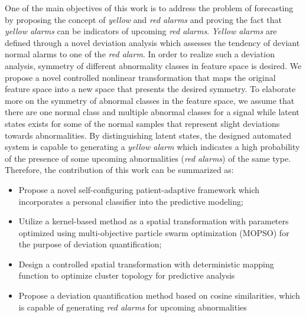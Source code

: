 
One of the main objectives of this work is to address the problem of forecasting by proposing the concept of \textit{yellow} and \textit{red alarms} and proving the fact that \textit{yellow alarms} can be indicators of upcoming \textit{red alarms}. \textit{Yellow alarms} are defined through a novel deviation analysis which assesses  the tendency of deviant normal alarms to one of the \textit{red alarm}. In order to realize such a deviation analysis, symmetry of different abnormality classes in feature space is desired. We propose a novel controlled nonlinear transformation that maps the original feature space into a new space that presents the desired symmetry. %
To elaborate more on the symmetry of abnormal classes in the feature space, we assume that there are one normal class and multiple abnormal classes for a signal while latent states exists for some of the normal samples that represent slight deviations towards abnormalities.%
By distinguishing  latent states, the designed automated system is capable to generating a \textit{yellow alarm} which indicates a high probability of the presence of some upcoming abnormalities (\textit{red alarms}) of the same type. Therefore, the contribution of this work can be summarized as:

\begin{itemize}
    \item Propose a novel self-configuring patient-adaptive framework which incorporates a personal classifier into the predictive modeling;
    \item Utilize a kernel-based method as a spatial transformation with parameters optimized using multi-objective particle swarm optimization (MOPSO) for the purpose of deviation quantification;
    \item Design a controlled spatial transformation with deterministic mapping function to optimize cluster topology for predictive analysis
    \item Propose a deviation quantification method based on cosine similarities, which is capable of generating \textit{red alarms} for upcoming abnormalities
\end{itemize}


